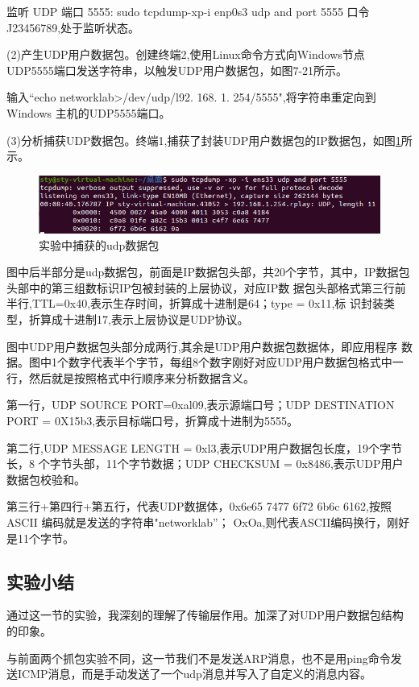 \documentclass[lang=cn,11pt,a4paper,cite=authoryear]{elegantpaper}
\begin{document}
监听 UDP 端口 5555: sudo tcpdump-xp-i enp0s3 udp and port 5555 口令J23456789,处于监听状态。

(2)产生UDP用户数据包。创建终端2,使用Linux命令方式向Windows节点 UDP5555端口发送字符串，以触发UDP用户数据包，如图7-21所示。

输入“echo networklab>/dev/udp/l92. 168. 1. 254/5555",将字符串重定向到 Windows 主机的UDP5555端口。

(3)分析捕获UDP数据包。终端1,捕获了封装UDP用户数据包的IP数据包，如图\ref{fig:udp}所示。

\begin{figure}[htbp]
	\centering
	\includegraphics[width=\linewidth]{image/udp}
	\caption{实验中捕获的udp数据包}
	\label{fig:udp}
\end{figure}

图中后半部分是udp数据包，前面是IP数据包头部，共20个字节，其中，IP数据包头部中的第三组数标识IP包被封装的上层协议，对应IP数 据包头部格式第三行前半行,TTL=0x40,表示生存时间，折算成十进制是64；type = 0x11,标 识封装类型，折算成十进制17,表示上层协议是UDP协议。

图中UDP用户数据包头部分成两行,其余是UDP用户数据包数据体，即应用程序 数据。图中1个数字代表半个字节，每组8个数字刚好对应UDP用户数据包格式中一 行，然后就是按照格式中行顺序来分析数据含义。

第一行，UDP SOURCE PORT=0xal09,表示源端口号；UDP DESTINATION PORT = 0X15b3,表示目标端口号，折算成十进制为5555。

第二行,UDP MESSAGE LENGTH = 0xl3,表示UDP用户数据包长度，19个字节长，8 个字节头部，11个字节数据；UDP CHECKSUM = 0x8486,表示UDP用户数据包校验和。

第三行+第四行+第五行，代表UDP数据体，0x6e65 7477 6f72 6b6c 6162,按照ASCII  
编码就是发送的字符串"networklab”； OxOa,则代表ASCII编码换行，刚好是11个字节。


\subsection{实验小结}

通过这一节的实验，我深刻的理解了传输层作用。加深了对UDP用户数据包结构的印象。

与前面两个抓包实验不同，这一节我们不是发送ARP消息，也不是用ping命令发送ICMP消息，而是手动发送了一个udp消息并写入了自定义的消息内容。
\end{document}

